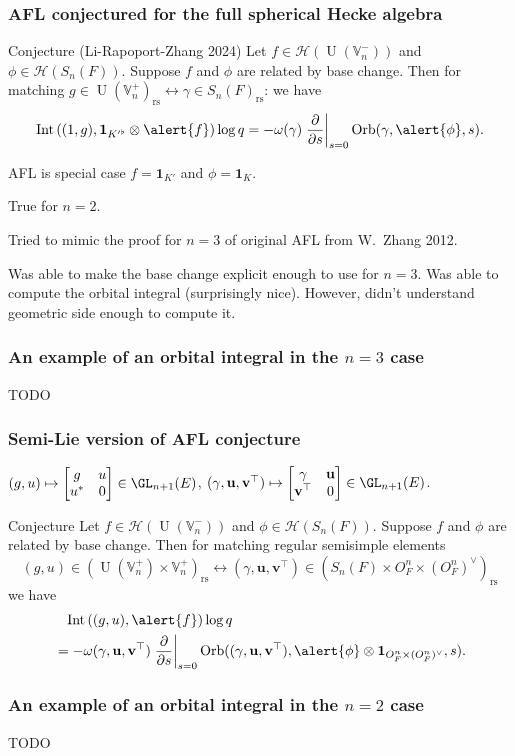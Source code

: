 \documentclass[11pt]{beamer}
\DeclareMathOperator{\Int}{Int}
\DeclareMathOperator{\Orb}{Orb}
\DeclareMathOperator{\U}{U}
\newcommand{\HH}{\mathcal{H}}
\newcommand{\VV}{\mathbb{V}}
\renewcommand{\OO}{O}
\newcommand{\guv}{{(\gamma, \uu, \vv^\top)}}
\newcommand{\rs}{_{\text{rs}}}
\newcommand{\uu}{\mathbf{u}}
\newcommand{\vv}{\mathbf{v}}
\newcommand{\oneV}{\mathbf{1}_{\OO_F^n \times (\OO_F^n)^\vee}}
\begin{document}
\begin{frame}
  \frametitle{AFL conjectured for the full spherical Hecke algebra}
  \begin{exampleblock}{Conjecture (Li-Rapoport-Zhang 2024)}
    Let \alert{$f \in \HH(\U(\VV_n^-))$} and \alert{$\phi \in \HH(S_n(F))$}.
    Suppose \alert{$f$ and $\phi$ are related by base change}.
    Then for matching $g \in \U(\VV_n^+)\rs \longleftrightarrow \gamma \in S_n(F)\rs$:
    we have
    \[ \Int\left( (1,g), \mathbf{1}_{K'^\flat} \otimes \alert{f} \right) \log q
    = -\omega(\gamma) \left. \pdv{}{s} \right\rvert_{s=0} \Orb(\gamma, \alert{\phi}, s). \]
  \end{exampleblock}
  AFL is special case $f = \mathbf{1}_{K'}$ and $\phi = \mathbf{1}_K$.
  \begin{theorem}
    True for $n = 2$.
  \end{theorem}
  Tried to mimic the proof for $n = 3$ of original AFL from W.\ Zhang 2012.
  \begin{itemize}
  \ii Was able to make the base change explicit enough to use for $n = 3$.
  \ii Was able to compute the orbital integral (surprisingly nice).
  \ii However, didn't understand geometric side enough to compute it.
  \end{itemize}
\end{frame}

\begin{frame}
  \frametitle{An example of an orbital integral in the $n=3$ case}
  TODO
\end{frame}

\begin{frame}
  \frametitle{Semi-Lie version of AFL conjecture}
  $(g,u) \mapsto \begin{bmatrix} g & u \\ u^\ast & 0 \end{bmatrix} \in \GL_{n+1}(E)$,
  $\guv \mapsto \begin{bmatrix} \gamma & \uu \\ \vv^\top & 0 \end{bmatrix} \in \GL_{n+1}(E)$.
  \begin{exampleblock}{Conjecture}
    Let \alert{$f \in \HH(\U(\VV_n^-))$} and \alert{$\phi \in \HH(S_n(F))$}.
    Suppose \alert{$f$ and $\phi$ are related by base change}.
    Then for matching regular semisimple elements
    \[ (g, u) \in (\U(\VV_n^+) \times \VV_n^+)\rs \longleftrightarrow
      \guv \in (S_n(F) \times \OO_F^n \times (\OO_F^n)^\vee)\rs \]
    we have
    \begin{align*}
      &\phantom= \Int\left( (g,u), \alert{f} \right) \log q \\
      &= -\omega\guv \left. \pdv{}{s} \right\rvert_{s=0}
      \Orb(\guv, \alert{\phi} \otimes \oneV, s).
    \end{align*}
  \end{exampleblock}
\end{frame}

\begin{frame}
  \frametitle{An example of an orbital integral in the $n=2$ case}
  TODO
\end{frame}
\end{document}
